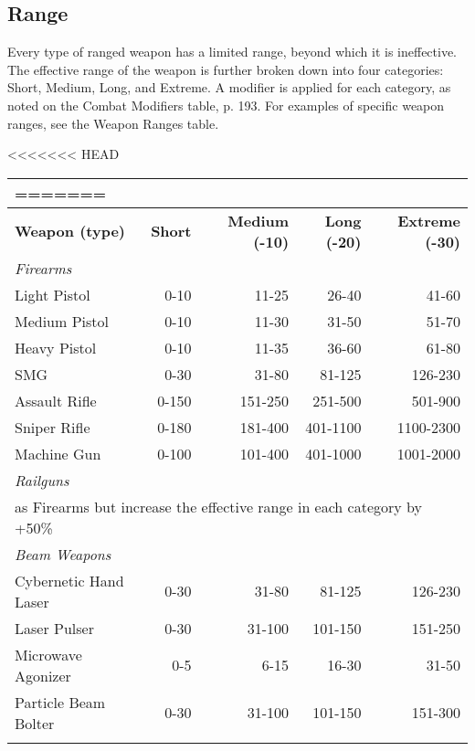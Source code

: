 \subsection{Range}
\label{sec:range}

Every type of ranged weapon has a limited range, beyond which it is ineffective. The effective range of the weapon is further broken down into four categories: Short, Medium, Long, and Extreme. A modifier is applied for each category, as noted on the Combat Modifiers table, p. 193. For examples of specific weapon ranges, see the Weapon Ranges table.

\begin{table}
<<<<<<< HEAD
\begin{tabular}{|l|r|r|r|r|}
=======
\begin{tabularx}{\textwidth}{|X|r|r|r|r|}
>>>>>>> 069efc938e743c2e1f7048421dcd3e53a984f73e
\hline
\multicolumn{5}{|c|}{\textbf{Weapon ranges}} \\
\hline
\textbf{Weapon (type)} & \textbf{Short} & \textbf{Medium (-10)} & \textbf{Long (-20)} & \textbf{Extreme (-30)}\\
\hline
\multicolumn{5}{|l|}{\emph{Firearms}} \\
\hline
Light Pistol			& 0-10	& 11-25	& 26-40		& 41-60		\\
\hline
Medium Pistol			& 0-10	& 11-30	& 31-50		& 51-70		\\
\hline
Heavy Pistol			& 0-10	& 11-35	& 36-60		& 61-80		\\
\hline
SMG					& 0-30	& 31-80	& 81-125		& 126-230		\\
\hline
Assault Rifle			& 0-150	& 151-250	& 251-500		& 501-900		\\
\hline
Sniper Rifle			& 0-180	& 181-400	& 401-1100	& 1100-2300	\\
\hline
Machine Gun			& 0-100	& 101-400	& 401-1000	& 1001-2000	\\
\hline
\multicolumn{5}{|l|}{\emph{Railguns}}\\
\hline
\multicolumn{5}{|l|}{as Firearms but increase the effective range in each category by +50\%} \\
\hline
\multicolumn{5}{|l|}{\emph{Beam Weapons}} \\
\hline
Cybernetic Hand Laser	& 0-30	& 31-80	& 81-125	& 126-230 \\
\hline
Laser Pulser			& 0-30	& 31-100	& 101-150	& 151-250 \\
\hline
Microwave Agonizer	& 0-5	& 6-15	& 16-30	& 31-50 \\
\hline
Particle Beam Bolter	& 0-30	& 31-100	& 101-150	& 151-300 \\

\end{tabularx}
\end{tabular}
\end{table}
